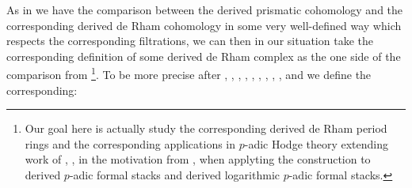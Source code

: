 \documentclass[11pt]{book}
\theoremstyle{definition}
\numberwithin{equation}{section}
\begin{document}
\indent As in \cite{12LL} we have the comparison between the derived prismatic cohomology and the corresponding derived de Rham cohomology in some very well-defined way which respects the corresponding filtrations, we can then in our situation take the corresponding definition of some derived de Rham complex as the one side of the comparison from \cite{12LL}\footnote{Our goal here is actually study the corresponding derived de Rham period rings and the corresponding applications in $p$-adic Hodge theory extending work of \cite{12DLLZ1}, \cite{12DLLZ2}, \cite{12Sch2} in the motivation from \cite{12GL}, when applyting the construction to derived $p$-adic formal stacks and derived logarithmic $p$-adic formal stacks.}. To be more precise after \cite[Chapitre 3]{12An1}, \cite{12An2}, \cite[Chapter 2, Chapter 8]{12B1}, \cite[Chapter 1]{12Bei}, \cite[Chapter 5]{12G1}, \cite[Chapter 3, Chapter 4]{12GL}, \cite[Chapitre II, Chapitre III]{12Ill1}, \cite[Chapitre VIII]{12Ill2}, \cite[Section 4]{12Qui}, and \cite[Example 5.11, Example 5.12]{BMS2} we define the corresponding:
\end{document}
